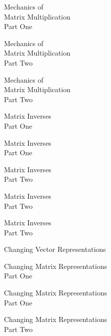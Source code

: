 \documentclass{titlescreen}
\begin{document}
\begin{videotitle}
  Mechanics of \\[0.5ex]
  Matrix Multiplication  \\[1ex]
  Part One
\end{videotitle}
\begin{videoend}
  Mechanics of \\[0.5ex]
  Matrix Multiplication  \\[1ex]
  Part Two
\end{videoend}

\begin{videotitle}
  Mechanics of \\[0.5ex]
  Matrix Multiplication  \\[1ex]
  Part Two
\end{videotitle}
\begin{videoend}
  Matrix Inverses  \\[1ex]
  Part One
\end{videoend}

\begin{videotitle}
  Matrix Inverses  \\[1ex]
  Part One
\end{videotitle}
\begin{videoend}
  Matrix Inverses  \\[1ex]
  Part Two
\end{videoend}

\begin{videotitle}
  Matrix Inverses  \\[1ex]
  Part Two
\end{videotitle}
\begin{videoend}
  Matrix Inverses  \\[1ex]
  Part Two
\end{videoend}


\begin{videotitle}
  Changing Vector Representations
\end{videotitle}
\begin{videoend}
  Changing Matrix Representations \\[1ex]
  Part One
\end{videoend}

\begin{videotitle}
  Changing Matrix Representations \\[1ex]
  Part One
\end{videotitle}
\begin{videoend}
  Changing Matrix Representations \\[1ex]
  Part Two
\end{videoend}
\end{document}
